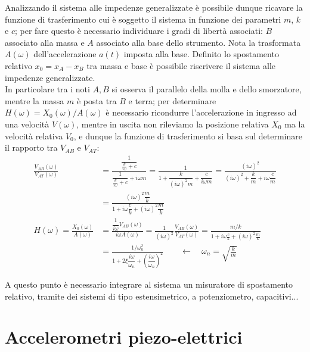 	Analizzando il sistema alle impedenze generalizzate è possibile dunque ricavare la funzione di trasferimento cui è soggetto il sistema in funzione dei parametri $m$, $k$ e $c$; per fare questo è necessario individuare i gradi di libertà associati: $B$ associato alla massa e $A$ associato alla base dello strumento. Nota la trasformata $A(\omega)$ dell'accelerazione $a(t)$ imposta alla base. Definito lo spostamento relativo $x_0 = x_A-x_B$ tra massa e base è possibile riscrivere il sistema alle impedenze generalizzate.\\
	In particolare tra i noti $A,B$ si osserva il parallelo della molla e dello smorzatore, mentre la massa $m$ è posta tra $B$ e terra; per determinare $H(\omega) = X_0(\omega) / A(\omega)$ è necessario ricondurre l'accelerazione in ingresso ad una velocità $V(\omega)$, mentre in uscita non rileviamo la posizione relativa $X_0$ ma la velocità relativa $V_0$, e dunque la funzione di trasferimento si basa sul determinare il rapporto tra $V_{AB}$ e $V_{AT}$:
	\begin{align*}
		\frac{V_{AB}(\omega)}{V_{AT}(\omega)} & = \frac{\dfrac{1}{\frac{k}{i\omega} + c}}{ \dfrac{1}{\frac{k}{i\omega} + c} + i\omega m} = \frac{1}{1 + \dfrac{k}{(i\omega)^2m} + \dfrac{c}{i\omega m}} = \frac{(i\omega)^2}{(i\omega)^2 + \dfrac k m + i\omega \dfrac c m } \\
		& = \frac{(i\omega) ^2 \dfrac m k}{1 + i\omega \dfrac c k + (i\omega)^2 \dfrac m k} \\
		H(\omega) = \frac{X_0(\omega)}{A(\omega)} & = \frac{\dfrac{1}{i\omega} V_{AB}(\omega)}{i\omega A(\omega)} = \frac{1}{(i\omega)^2} \frac{V_{AB}(\omega)}{V_{AT}(\omega)} = \frac{ m/k}{1 + i\omega \frac c k + (i\omega)^2 \frac m k}  \\
		&  = \frac{1 / \omega_n^2}{1+2\xi \dfrac{i\omega}{\omega_n} + \left(\dfrac{i\omega}{\omega_n}\right)^2 } \qquad \leftarrow \quad \omega_n = \sqrt{\frac k m}
	\end{align*}
	
	A questo punto è necessario integrare al sistema un misuratore di spostamento relativo, tramite dei sistemi di tipo estensimetrico, a potenziometro, capacitivi...
	
	
\section{Accelerometri piezo-elettrici}
	
	
	
	
	
	
	
	
	
	
	
	
	
	
	
	
	
	
	
	